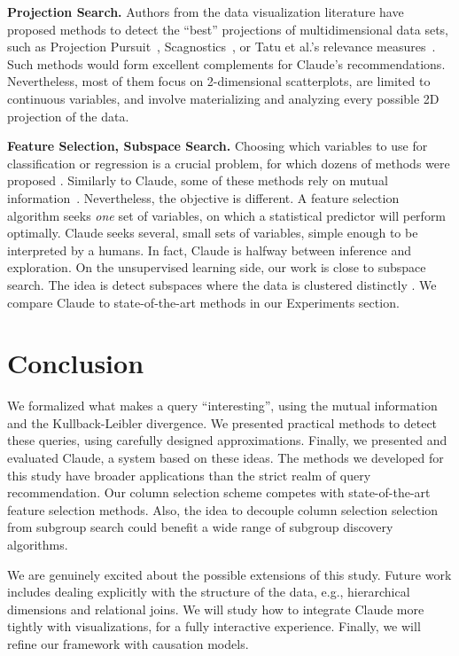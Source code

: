 \textbf{Projection Search.} Authors from the data visualization literature have
proposed methods to detect the ``best'' projections of multidimensional data
sets, such as Projection Pursuit~\cite{yoi1974projection},
Scagnostics~\cite{wilkinson2005graph}, or Tatu et al.'s relevance
measures~\cite{tatu2011automated}. Such methods would form excellent complements
for Claude's recommendations. Nevertheless, most of them focus on 2-dimensional
scatterplots, are limited to continuous variables, and involve materializing
and analyzing every possible 2D projection of the data.

\textbf{Feature Selection, Subspace Search.} Choosing which variables to use for
classification or regression is a crucial problem, for which dozens of methods
were proposed \cite{guyon2003introduction}. Similarly to Claude, some of these
methods rely on mutual information~\cite{peng2005feature}. Nevertheless, the
objective is different. A feature selection algorithm seeks \emph{one} set of
variables, on which a statistical predictor will perform optimally. Claude seeks
several, small sets of variables, simple enough to be interpreted by a humans.
In fact, Claude is halfway between inference and exploration.
On the unsupervised learning side, our work is close to subspace search. The
idea is detect subspaces where the data is clustered distinctly
\cite{keller2012hics,nguyen20134s}. We compare Claude to state-of-the-art
methods in our Experiments section.

\section{Conclusion}
\label{sec:conclusion}
We formalized what makes a query ``interesting'', using the mutual information
and the Kullback-Leibler divergence. We presented practical methods to detect
these queries, using carefully designed approximations.  Finally, we presented
and evaluated Claude, a system based on these ideas. The methods we developed
for this study have broader applications than the strict realm of query
recommendation. Our column selection scheme competes with state-of-the-art
feature selection methods. Also, the idea to decouple column selection
selection from subgroup search could benefit a wide range of subgroup discovery
algorithms.

We are genuinely excited about the possible extensions of this study. Future
work includes dealing explicitly with the structure of the data, e.g.,
hierarchical dimensions and relational joins. We will study how to integrate
Claude more tightly with visualizations, for a fully interactive experience.
Finally, we will refine our framework with causation models.
